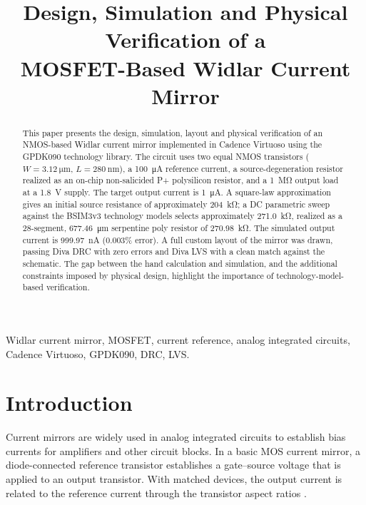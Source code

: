 \documentclass[conference]{IEEEtran}
\begin{document}
\title{Design, Simulation and Physical Verification of a\\ MOSFET-Based Widlar Current Mirror}

\author{%
}

\maketitle

\begin{abstract}
This paper presents the design, simulation, layout and physical verification
of an NMOS-based Widlar current mirror implemented in Cadence Virtuoso using
the GPDK090 technology library. The circuit uses two equal NMOS transistors
($W=\SI{3.12}{\micro\metre}$, $L=\SI{280}{\nano\metre}$), a
\SI{100}{\micro\ampere} reference current, a source-degeneration resistor
realized as an on-chip non-salicided P+ polysilicon resistor, and a
\SI{1}{\mega\ohm} output load at a \SI{1.8}{\volt} supply. The target output
current is \SI{1}{\micro\ampere}. A square-law approximation gives an initial
source resistance of approximately \SI{204}{\kilo\ohm}; a DC parametric sweep
against the BSIM3v3 technology models selects approximately
\SI{271.0}{\kilo\ohm}, realized as a 28-segment, \SI{677.46}{\micro\metre}
serpentine poly resistor of \SI{270.98}{\kilo\ohm}. The simulated output
current is \SI{999.97}{\nano\ampere} (0.003\% error). A full custom layout of
the mirror was drawn, passing Diva DRC with zero errors and Diva LVS with a
clean match against the schematic. The gap between the hand calculation and
simulation, and the additional constraints imposed by physical design,
highlight the importance of technology-model-based verification.
\end{abstract}

\begin{IEEEkeywords}
Widlar current mirror, MOSFET, current reference, analog integrated circuits,
Cadence Virtuoso, GPDK090, DRC, LVS.
\end{IEEEkeywords}

\section{Introduction}
Current mirrors are widely used in analog integrated circuits to establish
bias currents for amplifiers and other circuit blocks. In a basic MOS current
mirror, a diode-connected reference transistor establishes a gate--source
voltage that is applied to an output transistor. With matched devices, the
output current is related to the reference current through the transistor
aspect ratios \cite{widlar,adi}.
\end{document}
